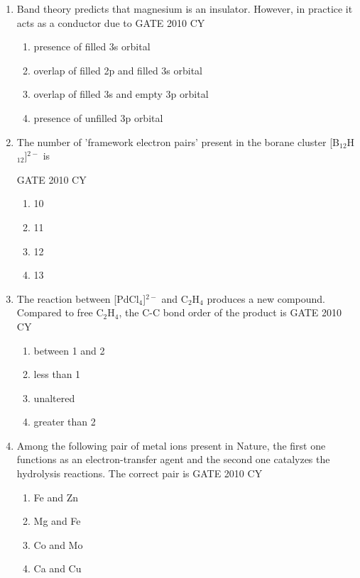 \documentclass[journal,12pt,onecolumn]{IEEEtran}
\theoremstyle{remark}
\begin{document}
\begin{enumerate}
\item Band theory predicts that magnesium is an insulator. However, in practice it acts as a conductor due to
\hfill{GATE 2010 CY}
\begin{multicols}{2}
\begin{enumerate}
    \item presence of filled 3s orbital
    \item overlap of filled 2p and filled 3s orbital
    \item overlap of filled 3s and empty 3p orbital
    \item presence of unfilled 3p orbital
\end{enumerate}
\end{multicols}

\item The number of 'framework electron pairs' present in the borane cluster [B$_{12}$H$_{12}$]$^{2-}$ is

\hfill{GATE 2010 CY}
\begin{multicols}{2}
\begin{enumerate}
    \item 10
    \item 11
    \item 12
    \item 13
\end{enumerate}
\end{multicols}

\item The reaction between [PdCl$_4$]$^{2-}$ and C$_2$H$_4$ produces a new compound. Compared to free C$_2$H$_4$, the C-C bond order of the product is
\hfill{GATE 2010 CY}
\begin{multicols}{2}
\begin{enumerate}
    \item between 1 and 2
    \item less than 1
    \item unaltered
    \item greater than 2
\end{enumerate}
\end{multicols}

\item Among the following pair of metal ions present in Nature, the first one functions as an electron-transfer agent and the second one catalyzes the hydrolysis reactions. The correct pair is
\hfill{GATE 2010 CY}
\begin{multicols}{2}
\begin{enumerate}
    \item Fe and Zn
    \item Mg and Fe
    \item Co and Mo
    \item Ca and Cu
\end{enumerate}
\end{multicols}


\end{enumerate}
\end{document}
